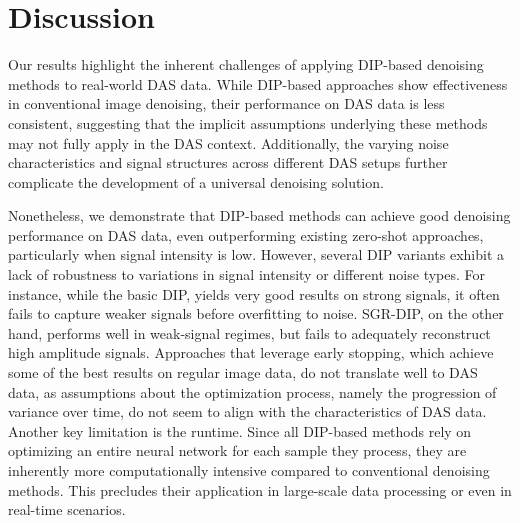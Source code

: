 \chapter{Discussion}

Our results highlight the inherent challenges of applying DIP-based denoising methods to real-world DAS data.
While DIP-based approaches show effectiveness in conventional image denoising, their performance on DAS data is less consistent, suggesting that the implicit assumptions underlying these methods may not fully apply in the DAS context.
Additionally, the varying noise characteristics and signal structures across different DAS setups further complicate the development of a universal denoising solution.

Nonetheless, we demonstrate that DIP-based methods can achieve good denoising performance on DAS data, even outperforming existing zero-shot approaches, particularly when signal intensity is low.
However, several DIP variants exhibit a lack of robustness to variations in signal intensity or different noise types.
For instance, while the basic DIP, yields very good results on strong signals, it often fails to capture weaker signals before overfitting to noise.
SGR-DIP, on the other hand, performs well in weak-signal regimes, but fails to adequately reconstruct high amplitude signals.
Approaches that leverage early stopping, which achieve some of the best results on regular image data, do not translate well to DAS data, as assumptions about the optimization process, namely the progression of variance over time, do not seem to align with the characteristics of DAS data.
Another key limitation is the runtime.
Since all DIP-based methods rely on optimizing an entire neural network for each sample they process, they are inherently more computationally intensive compared to conventional denoising methods.
This precludes their application in large-scale data processing or even in real-time scenarios.
